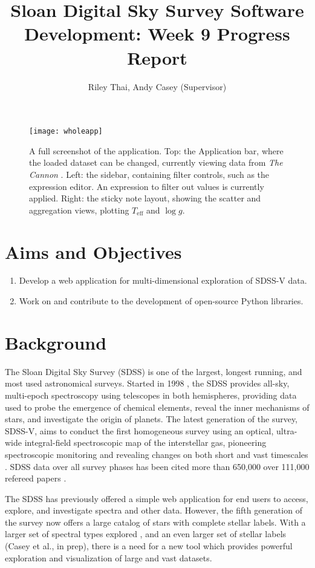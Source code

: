 \documentclass[a4paper,10pt,twocolumn]{article}
\title{Sloan Digital Sky Survey Software Development: Week 9 Progress Report}
\author{Riley Thai, Andy Casey (Supervisor)}
\begin{document}
\maketitle
\begin{figure*}
	\texttt{[image: wholeapp]}
	\caption{A full screenshot of the application. Top: the Application bar, where the loaded dataset can be changed, currently viewing data from \emph{The Cannon} \parencite{thecannon}. Left: the sidebar, containing filter controls, such as the expression editor. An expression to filter out values is currently applied. Right: the sticky note layout, showing the scatter and aggregation views, plotting $T_{\mathrm{eff}}$ and $\log g$.}
	\label{fig:wholeapp}
\end{figure*}
\section{Aims and Objectives}
\begin{enumerate}
	\item Develop a web application for multi-dimensional exploration of SDSS-V data.
	\item Work on and contribute to the development of open-source Python libraries.
\end{enumerate}

\section{Background}
The Sloan Digital Sky Survey (SDSS) is one of the largest, longest running, and most used astronomical surveys. Started in 1998 \parencite{dr18}, the SDSS provides all-sky, multi-epoch spectroscopy using telescopes in both hemispheres, providing data used to probe the emergence of chemical elements, reveal the inner mechanisms of stars, and investigate the origin of planets. The latest generation of the survey, SDSS-V, aims to conduct the first homogeneous survey using an optical, ultra-wide integral-field spectroscopic map of the interstellar gas, pioneering spectroscopic monitoring and revealing changes on both short and vast timescales \parencite{SDSS2017}. SDSS data over all survey phases has been cited more than 650,000 over 111,000 refereed papers \parencite{dr18}.

The SDSS has previously offered a simple web application for end users to access, explore, and investigate spectra and other data. However, the fifth generation of the survey now offers a large catalog of stars with complete stellar labels. With a larger set of spectral types explored \parencite{apogee2017}, and an even larger set of stellar labels (Casey et al., in prep), there is a need for a new tool which provides powerful exploration and visualization of large and vast datasets.
\end{document}
